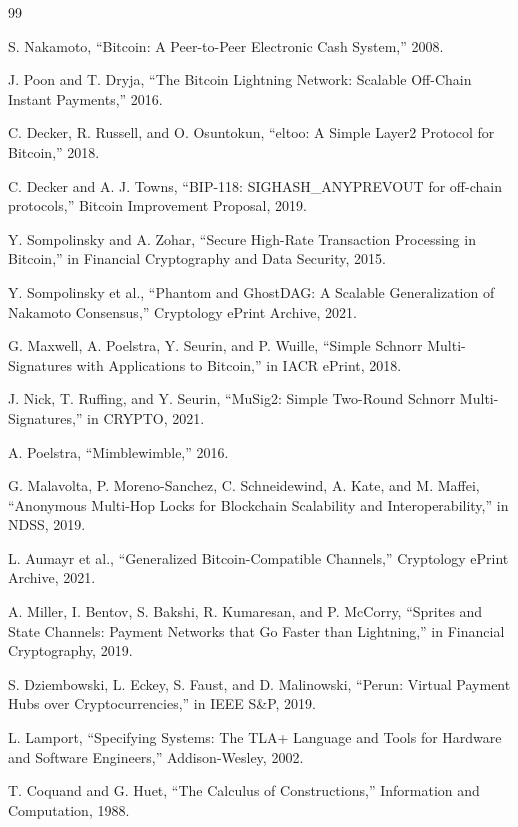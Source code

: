 \documentclass[11pt,a4paper]{article}
\begin{document}
\newpage
\begin{thebibliography}{99}

S. Nakamoto, ``Bitcoin: A Peer-to-Peer Electronic Cash System,'' 2008.

J. Poon and T. Dryja, ``The Bitcoin Lightning Network: Scalable Off-Chain Instant Payments,'' 2016.

C. Decker, R. Russell, and O. Osuntokun, ``eltoo: A Simple Layer2 Protocol for Bitcoin,'' 2018.

C. Decker and A. J. Towns, ``BIP-118: SIGHASH\_ANYPREVOUT for off-chain protocols,'' Bitcoin Improvement Proposal, 2019.

Y. Sompolinsky and A. Zohar, ``Secure High-Rate Transaction Processing in Bitcoin,'' in Financial Cryptography and Data Security, 2015.

Y. Sompolinsky et al., ``Phantom and GhostDAG: A Scalable Generalization of Nakamoto Consensus,'' Cryptology ePrint Archive, 2021.

G. Maxwell, A. Poelstra, Y. Seurin, and P. Wuille, ``Simple Schnorr Multi-Signatures with Applications to Bitcoin,'' in IACR ePrint, 2018.

J. Nick, T. Ruffing, and Y. Seurin, ``MuSig2: Simple Two-Round Schnorr Multi-Signatures,'' in CRYPTO, 2021.

A. Poelstra, ``Mimblewimble,'' 2016.

G. Malavolta, P. Moreno-Sanchez, C. Schneidewind, A. Kate, and M. Maffei, ``Anonymous Multi-Hop Locks for Blockchain Scalability and Interoperability,'' in NDSS, 2019.

L. Aumayr et al., ``Generalized Bitcoin-Compatible Channels,'' Cryptology ePrint Archive, 2021.

A. Miller, I. Bentov, S. Bakshi, R. Kumaresan, and P. McCorry, ``Sprites and State Channels: Payment Networks that Go Faster than Lightning,'' in Financial Cryptography, 2019.

S. Dziembowski, L. Eckey, S. Faust, and D. Malinowski, ``Perun: Virtual Payment Hubs over Cryptocurrencies,'' in IEEE S\&P, 2019.

L. Lamport, ``Specifying Systems: The TLA+ Language and Tools for Hardware and Software Engineers,'' Addison-Wesley, 2002.

T. Coquand and G. Huet, ``The Calculus of Constructions,'' Information and Computation, 1988.

\end{thebibliography}
\end{document}
